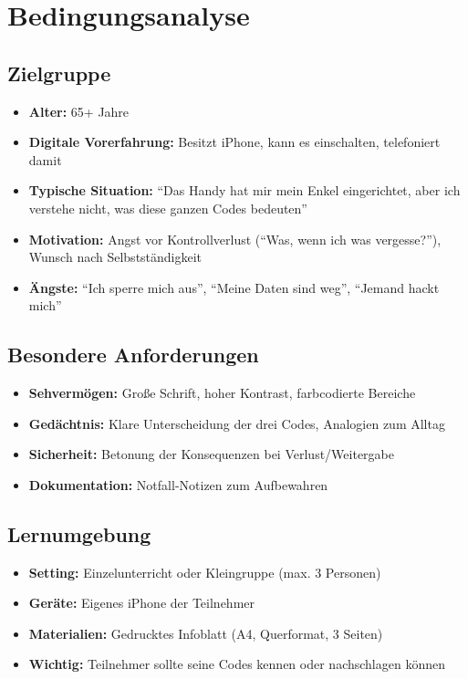 \documentclass[11pt,a4paper]{article}
\begin{document}
\section{Bedingungsanalyse}

\subsection{Zielgruppe}
\begin{itemize}
    \item \textbf{Alter:} 65+ Jahre
    \item \textbf{Digitale Vorerfahrung:} Besitzt iPhone, kann es einschalten, telefoniert damit
    \item \textbf{Typische Situation:} ``Das Handy hat mir mein Enkel eingerichtet, aber ich verstehe nicht, was diese ganzen Codes bedeuten''
    \item \textbf{Motivation:} Angst vor Kontrollverlust (``Was, wenn ich was vergesse?''), Wunsch nach Selbstständigkeit
    \item \textbf{Ängste:} ``Ich sperre mich aus'', ``Meine Daten sind weg'', ``Jemand hackt mich''
\end{itemize}

\subsection{Besondere Anforderungen}
\begin{itemize}
    \item \textbf{Sehvermögen:} Große Schrift, hoher Kontrast, farbcodierte Bereiche
    \item \textbf{Gedächtnis:} Klare Unterscheidung der drei Codes, Analogien zum Alltag
    \item \textbf{Sicherheit:} Betonung der Konsequenzen bei Verlust/Weitergabe
    \item \textbf{Dokumentation:} Notfall-Notizen zum Aufbewahren
\end{itemize}

\subsection{Lernumgebung}
\begin{itemize}
    \item \textbf{Setting:} Einzelunterricht oder Kleingruppe (max. 3 Personen)
    \item \textbf{Geräte:} Eigenes iPhone der Teilnehmer
    \item \textbf{Materialien:} Gedrucktes Infoblatt (A4, Querformat, 3 Seiten)
    \item \textbf{Wichtig:} Teilnehmer sollte seine Codes kennen oder nachschlagen können
\end{itemize}
\end{document}
